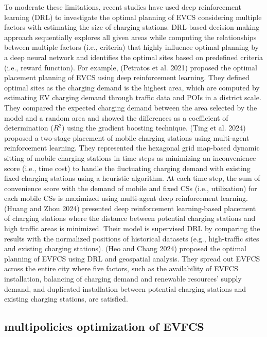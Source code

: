 \documentclass[preprint,12pt]{elsarticle}
\begin{document}
To moderate these limitations, recent studies have used deep reinforcement learning (DRL) to investigate the optimal planning of EVCS considering multiple factors with estimating the size of charging stations. DRL-based decision-making approach sequentially explores all given areas while computing the relationships between multiple factors (i.e., criteria) that highly influence optimal planning by a deep neural network and identifies the optimal sites based on predefined criteria (i.e., reward function). For example, (Petratos et al. 2021) proposed the optimal placement planning of EVCS using deep reinforcement learning. They defined optimal sites as the charging demand is the highest area, which are computed by estimating EV charging demand through traffic data and POIs in a district scale. They compared the expected charging demand between the area selected by the model and a random area and showed the differences as a coefficient of determination ($R^2$) using the gradient boosting technique. (Ting et al. 2024) proposed a two-stage placement of mobile charging stations using multi-agent reinforcement learning. They represented the hexagonal grid map-based dynamic sitting of mobile charging stations in time steps as minimizing an inconvenience score (i.e., time cost) to handle the fluctuating charging demand with existing fixed charging stations using a heuristic algorithm. At each time step, the sum of convenience score with the demand of mobile and fixed CSs (i.e., utilization) for each mobile CSs is maximized using multi-agent deep reinforcement learning. (Huang and Zhou 2024) presented deep reinforcement learning-based placement of charging stations where the distance between potential charging stations and high traffic areas is minimized. Their model is supervised DRL by comparing the results with the normalized positions of historical datasets (e.g., high-traffic sites and existing charging stations). (Heo and Chang 2024) proposed the optimal planning of EVFCS using DRL and geospatial analysis. They spread out EVFCS across the entire city where five factors, such as the availability of EVFCS installation, balancing of charging demand and renewable resources' supply demand, and duplicated installation between potential charging stations and existing charging stations, are satisfied.  

\subsection{multipolicies optimization of EVFCS}
\end{document}
